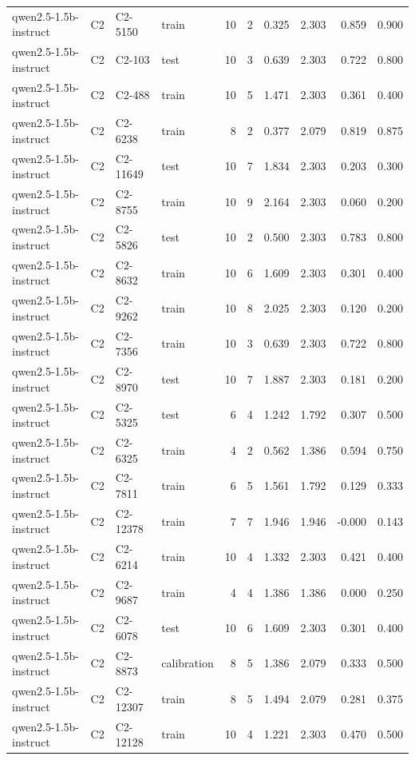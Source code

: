\begin{table}
\begin{tabular}{llllrrrrrr}
qwen2.5-1.5b-instruct & C2 & C2-5150 & train & 10 & 2 & 0.325 & 2.303 & 0.859 & 0.900 \\
qwen2.5-1.5b-instruct & C2 & C2-103 & test & 10 & 3 & 0.639 & 2.303 & 0.722 & 0.800 \\
qwen2.5-1.5b-instruct & C2 & C2-488 & train & 10 & 5 & 1.471 & 2.303 & 0.361 & 0.400 \\
qwen2.5-1.5b-instruct & C2 & C2-6238 & train & 8 & 2 & 0.377 & 2.079 & 0.819 & 0.875 \\
qwen2.5-1.5b-instruct & C2 & C2-11649 & test & 10 & 7 & 1.834 & 2.303 & 0.203 & 0.300 \\
qwen2.5-1.5b-instruct & C2 & C2-8755 & train & 10 & 9 & 2.164 & 2.303 & 0.060 & 0.200 \\
qwen2.5-1.5b-instruct & C2 & C2-5826 & test & 10 & 2 & 0.500 & 2.303 & 0.783 & 0.800 \\
qwen2.5-1.5b-instruct & C2 & C2-8632 & train & 10 & 6 & 1.609 & 2.303 & 0.301 & 0.400 \\
qwen2.5-1.5b-instruct & C2 & C2-9262 & train & 10 & 8 & 2.025 & 2.303 & 0.120 & 0.200 \\
qwen2.5-1.5b-instruct & C2 & C2-7356 & train & 10 & 3 & 0.639 & 2.303 & 0.722 & 0.800 \\
qwen2.5-1.5b-instruct & C2 & C2-8970 & test & 10 & 7 & 1.887 & 2.303 & 0.181 & 0.200 \\
qwen2.5-1.5b-instruct & C2 & C2-5325 & test & 6 & 4 & 1.242 & 1.792 & 0.307 & 0.500 \\
qwen2.5-1.5b-instruct & C2 & C2-6325 & train & 4 & 2 & 0.562 & 1.386 & 0.594 & 0.750 \\
qwen2.5-1.5b-instruct & C2 & C2-7811 & train & 6 & 5 & 1.561 & 1.792 & 0.129 & 0.333 \\
qwen2.5-1.5b-instruct & C2 & C2-12378 & train & 7 & 7 & 1.946 & 1.946 & -0.000 & 0.143 \\
qwen2.5-1.5b-instruct & C2 & C2-6214 & train & 10 & 4 & 1.332 & 2.303 & 0.421 & 0.400 \\
qwen2.5-1.5b-instruct & C2 & C2-9687 & train & 4 & 4 & 1.386 & 1.386 & 0.000 & 0.250 \\
qwen2.5-1.5b-instruct & C2 & C2-6078 & test & 10 & 6 & 1.609 & 2.303 & 0.301 & 0.400 \\
qwen2.5-1.5b-instruct & C2 & C2-8873 & calibration & 8 & 5 & 1.386 & 2.079 & 0.333 & 0.500 \\
qwen2.5-1.5b-instruct & C2 & C2-12307 & train & 8 & 5 & 1.494 & 2.079 & 0.281 & 0.375 \\
qwen2.5-1.5b-instruct & C2 & C2-12128 & train & 10 & 4 & 1.221 & 2.303 & 0.470 & 0.500 \\

\end{tabular}
\end{table}
